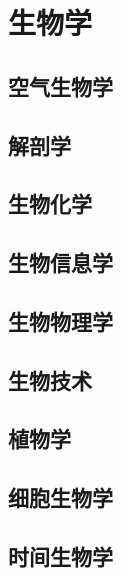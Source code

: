 \documentclass[UTF8]{NatureUniverse}
\begin{document}





\chapter{生物学}    %


\section{空气生物学}
\section{解剖学}
\section{生物化学}
\section{生物信息学}
\section{生物物理学}
\section{生物技术}
\section{植物学}
\section{细胞生物学}
\section{时间生物学}
\end{document}
